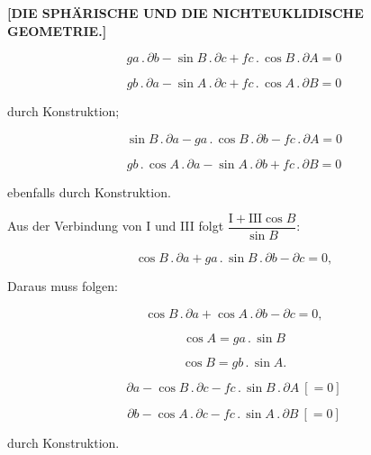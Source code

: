 \clearpage
{}%
\begin{center}
\textbf{[DIE SPHÄRISCHE UND DIE NICHTEUKLIDISCHE GEOMETRIE.]}

\smallskip

\end{center}

\[
\tag*{I.} ga\,.\,\partial b - \sin B\,.\,\partial c + fc\,.\,\cos B\,.\,\partial A = 0
\]

\[
\tag*{II.} gb\,.\,\partial a - \sin A\,.\,\partial c + fc\,.\,\cos A\,.\,\partial B = 0
\]

\noindent durch Konstruktion;

\[
\tag*{III.} \sin B\,.\,\partial a - ga\,.\,\cos B\,.\,\partial b - fc\,.\,\partial A = 0
\]

\[
\tag*{IV.} gb\,.\,\cos A\,.\,\partial a - \sin A\,.\,\partial b + fc\,.\,\partial B = 0
\]

\noindent ebenfalls durch Konstruktion.

\begin{center}\end{center}

\noindent Aus der Verbindung von I und III folgt $\dfrac{\text{I}+\text{III}\cos B}{\sin B}$:

\[
\cos B\,.\,\partial a + ga\,.\,\sin B\,.\,\partial b - \partial c = 0,
\]

\noindent Daraus muss folgen:

\[
\tag*{V.} \cos B\,.\,\partial a + \cos A\,.\,\partial b - \partial c = 0,
\]

\[
\tag*{1)} \cos A = ga\,.\,\sin B
\]

\[
\tag*{2)} \cos B = gb\,.\,\sin A.
\]

\[
\tag*{VI.} \partial a - \cos B\,.\,\partial c - fc\,.\,\sin B\,.\,\partial A\ [= 0]
\]

\[
\tag*{VII.} \partial b - \cos A\,.\,\partial c - fc\,.\,\sin A\,.\,\partial B\ [= 0]
\]

\noindent durch Konstruktion.
